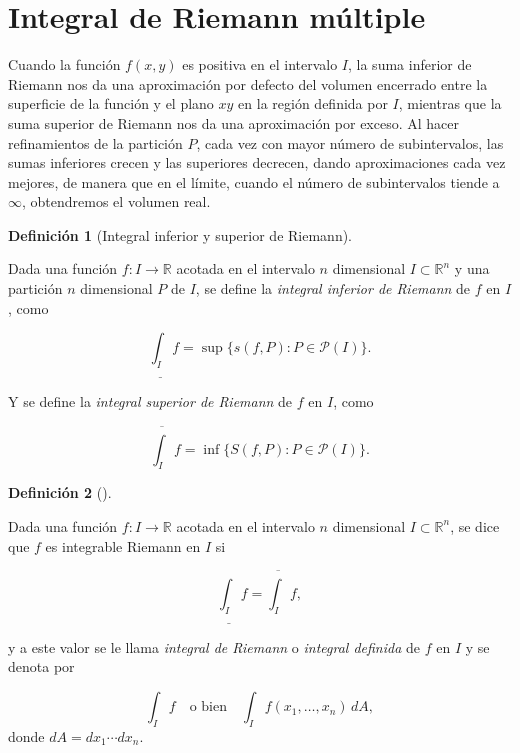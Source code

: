 \documentclass[
  a4paper,
]{scrreport}
\theoremstyle{plain}
\theoremstyle{definition}
\theoremstyle{plain}
\theoremstyle{plain}
\theoremstyle{definition}
\theoremstyle{definition}
\newtheorem{definition}{Definición}[chapter]
\theoremstyle{remark}
\begin{document}
\section{Integral de Riemann
múltiple}\label{integral-de-riemann-muxfaltiple}

Cuando la función \(f(x,y)\) es positiva en el intervalo \(I\), la suma
inferior de Riemann nos da una aproximación por defecto del volumen
encerrado entre la superficie de la función y el plano \(xy\) en la
región definida por \(I\), mientras que la suma superior de Riemann nos
da una aproximación por exceso. Al hacer refinamientos de la partición
\(P\), cada vez con mayor número de subintervalos, las sumas inferiores
crecen y las superiores decrecen, dando aproximaciones cada vez mejores,
de manera que en el límite, cuando el número de subintervalos tiende a
\(\infty\), obtendremos el volumen real.

\begin{definition}[Integral inferior y superior de
Riemann]\protect\hypertarget{def-integral-inferior-superior-riemann-multiple}{}\label{def-integral-inferior-superior-riemann-multiple}

Dada una función \(f:I\to \mathbb{R}\) acotada en el intervalo \(n\)
dimensional \(I\subset \mathbb{R}^n\) y una partición \(n\) dimensional
\(P\) de \(I\), se define la \emph{integral inferior de Riemann} de
\(f\) en \(I\), como

\[
\underline{\int_I} f = \sup\{s(f,P): P\in\mathcal{P}(I)\}.
\]

Y se define la \emph{integral superior de Riemann} de \(f\) en \(I\),
como

\[
\overline{\int_I} f = \inf\{S(f,P): P\in\mathcal{P}(I)\}.
\]

\end{definition}

\begin{definition}[]\protect\hypertarget{def-integral-riemann-n-dimensional}{}\label{def-integral-riemann-n-dimensional}

Dada una función \(f:I\to \mathbb{R}\) acotada en el intervalo \(n\)
dimensional \(I\subset \mathbb{R}^n\), se dice que \(f\) es integrable
Riemann en \(I\) si

\[
\underline{\int_I} f = \overline{\int_I}f,
\]

y a este valor se le llama \emph{integral de Riemann} o \emph{integral
definida} de \(f\) en \(I\) y se denota por

\[
\int_I f \quad \mbox{o bien} \quad \int_I f(x_1,\ldots,x_n)\,dA,
\] donde \(dA = dx_1\cdots dx_n\).

\end{definition}
\end{document}
